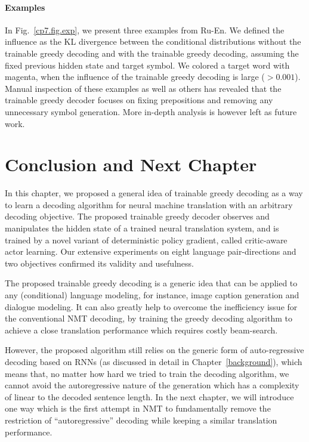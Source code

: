 \paragraph{Examples} 

In Fig.~\ref{cp7.fig.exp}, we present three examples from Ru-En. We defined the influence as the KL divergence between the conditional distributions without the trainable greedy decoding and with the trainable greedy decoding, assuming the fixed previous hidden state and target symbol. We colored a target word with magenta, when the influence of the trainable greedy decoding is large ($> 0.001$).  Manual inspection of these examples as well as others has revealed that the trainable greedy decoder focuses on fixing prepositions and removing any unnecessary symbol generation. More in-depth analysis is however left as future work. 




\section{Conclusion and Next Chapter}
In this chapter, we proposed a general idea of trainable greedy decoding as a way to learn a decoding algorithm for neural machine translation with an arbitrary decoding objective. The proposed trainable greedy decoder observes and manipulates the hidden state of a trained neural translation system, and is trained by a novel variant of deterministic policy gradient, called critic-aware actor learning. 
Our extensive experiments on eight language pair-directions and two objectives confirmed its validity and usefulness. 

The proposed trainable greedy decoding is a generic idea that can be applied to any (conditional) language modeling, for instance, image caption generation and dialogue modeling. It can also greatly help to overcome the inefficiency issue for the conventional NMT decoding, by training the greedy decoding algorithm to achieve a close translation performance which requires costly beam-search.

However, the proposed algorithm still relies on the generic form of auto-regressive decoding based on RNNs (as discussed in detail in Chapter~\ref{background}), which means that, no matter how hard we tried to train the decoding algorithm, we cannot avoid the autoregressive nature of the generation which has a complexity of linear to the decoded sentence length. In the next chapter, we will introduce one way which is the first attempt in NMT to fundamentally remove the restriction of ``autoregressive'' decoding while keeping a similar translation performance.

